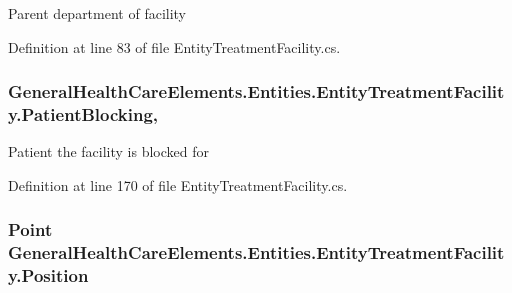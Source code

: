 Parent department of facility 



Definition at line 83 of file Entity\+Treatment\+Facility.\+cs.

\subsubsection[{\texorpdfstring{Patient\+Blocking}{PatientBlocking}}]{ General\+Health\+Care\+Elements.\+Entities.\+Entity\+Treatment\+Facility.\+Patient\+Blocking\hspace{0.3cm}{\ttfamily [get]}, {\ttfamily [set]}}\hypertarget{class_general_health_care_elements_1_1_entities_1_1_entity_treatment_facility_a38ee84ef8250faad31db0f29de6b94b1}{}\label{class_general_health_care_elements_1_1_entities_1_1_entity_treatment_facility_a38ee84ef8250faad31db0f29de6b94b1}


Patient the facility is blocked for 



Definition at line 170 of file Entity\+Treatment\+Facility.\+cs.

\subsubsection[{\texorpdfstring{Position}{Position}}]{\setlength{\rightskip}{0pt plus 5cm}Point General\+Health\+Care\+Elements.\+Entities.\+Entity\+Treatment\+Facility.\+Position\hspace{0.3cm}{\ttfamily [get]}}\hypertarget{class_general_health_care_elements_1_1_entities_1_1_entity_treatment_facility_ab4d70f5b558d7a411734dfd5febf812b}{}\label{class_general_health_care_elements_1_1_entities_1_1_entity_treatment_facility_ab4d70f5b558d7a411734dfd5febf812b}


